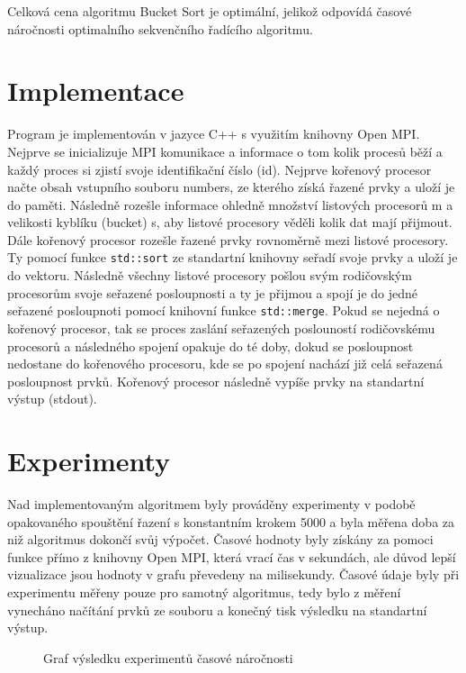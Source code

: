 \documentclass[12pt, a4paper]{article}
\begin{document}
Celková cena algoritmu Bucket Sort je optimální, jelikož odpovídá časové náročnosti optimalního sekvenčního řadícího algoritmu.

\section{Implementace}
Program je implementován v jazyce C++ s využitím knihovny Open MPI. Nejprve se inicializuje MPI komunikace a informace o tom kolik procesů běží a každý proces si zjistí svoje identifikační číslo (id). Nejprve kořenový procesor načte obsah vstupního souboru numbers, ze kterého získá řazené prvky a uloží je do paměti. Následně rozešle informace ohledně množství listových procesorů m a velikosti kyblíku (bucket) s, aby listové procesory věděli kolik dat mají přijmout. Dále kořenový procesor rozešle řazené prvky rovnoměrně mezi listové procesory. Ty pomocí funkce \texttt{std::sort} ze standartní knihovny seřadí svoje prvky a uloží je do vektoru. Následně všechny listové procesory pošlou svým rodičovským procesorům svoje seřazené posloupnosti a ty je přijmou a spojí je do jedné seřazené posloupnoti pomocí knihovní funkce \texttt{std::merge}. Pokud se nejedná o kořenový procesor, tak se proces zaslání seřazených poslouností rodičovskému procesorů a následného spojení opakuje do té doby, dokud se posloupnost nedostane do kořenového procesoru, kde se po spojení nachází již celá seřazená posloupnost prvků. Kořenový procesor následně vypíše prvky na standartní výstup (stdout).

\section{Experimenty}
Nad implementovaným algoritmem byly prováděny experimenty v podobě opakovaného spouštění řazení s konstantním krokem 5000 a byla měřena doba za niž algoritmus dokončí svůj výpočet. Časové hodnoty byly získány za pomoci funkce přímo z knihovny Open MPI, která vrací čas v sekundách, ale důvod lepší vizualizace jsou hodnoty v grafu převedeny na milisekundy. Časové údaje byly při experimentu měřeny pouze pro samotný algoritmus, tedy bylo z měření vynecháno načítání prvků ze souboru a konečný tisk výsledku na standartní výstup.


\begin{figure}[h]\centering
	\label{fig:experimenty}
	\caption{Graf výsledku experimentů časové náročnosti}	
\end{figure}
\end{document}

